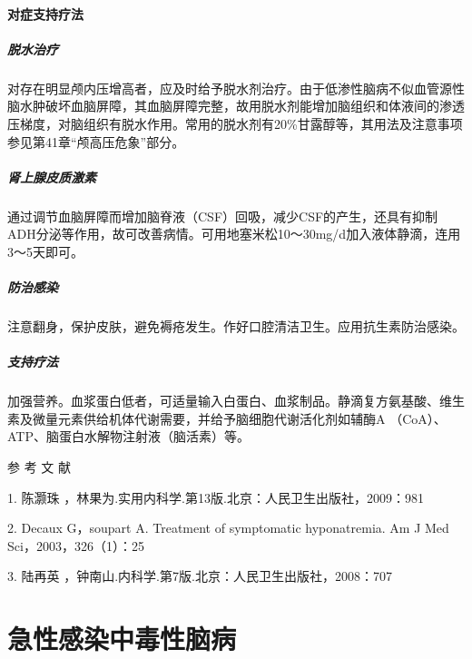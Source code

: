 \subsubsection{对症支持疗法}

\paragraph{脱水治疗}

对存在明显颅内压增高者，应及时给予脱水剂治疗。由于低渗性脑病不似血管源性脑水肿破坏血脑屏障，其血脑屏障完整，故用脱水剂能增加脑组织和体液间的渗透压梯度，对脑组织有脱水作用。常用的脱水剂有20\%甘露醇等，其用法及注意事项参见第41章“颅高压危象”部分。

\paragraph{肾上腺皮质激素}

通过调节血脑屏障而增加脑脊液（CSF）回吸，减少CSF的产生，还具有抑制ADH分泌等作用，故可改善病情。可用地塞米松10～30mg/d加入液体静滴，连用3～5天即可。

\paragraph{防治感染}

注意翻身，保护皮肤，避免褥疮发生。作好口腔清洁卫生。应用抗生素防治感染。

\paragraph{支持疗法}

加强营养。血浆蛋白低者，可适量输入白蛋白、血浆制品。静滴复方氨基酸、维生素及微量元素供给机体代谢需要，并给予脑细胞代谢活化剂如辅酶A
（CoA）、ATP、脑蛋白水解物注射液（脑活素）等。
\protect\hypertarget{text00104.html}{}{}

\hypertarget{text00104.htmlux5cux23CHP4-4-4}{}
参 考 文 献

1. 陈灏珠 ，林果为.实用内科学.第13版.北京：人民卫生出版社，2009：981

2. Decaux G，soupart A. Treatment of symptomatic hyponatremia. Am J Med
Sci，2003，326（1）：25

3. 陆再英 ，钟南山.内科学.第7版.北京：人民卫生出版社，2008：707

\protect\hypertarget{text00105.html}{}{}

\chapter{急性感染中毒性脑病}

